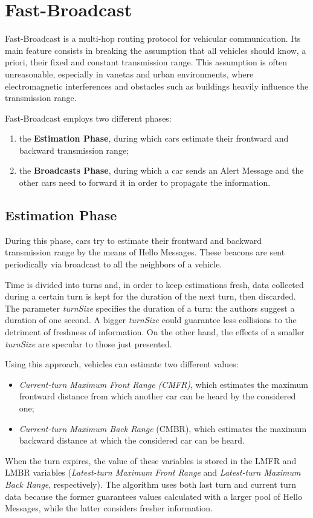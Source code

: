
\chapter{Fast-Broadcast}
	\label{chapter:fb}
	Fast-Broadcast \cite{4199282} is a multi-hop routing protocol for vehicular communication. Its main feature consists in breaking the assumption that all vehicles should know, a priori, their fixed and constant transmission range. This assumption is often unreasonable, especially in \acrshort{vaneta}s and urban environments, where electromagnetic interferences and obstacles such as buildings heavily influence the transmission range.
	
	
	Fast-Broadcast employs two different phases:
	\begin{enumerate}
		\item the \textbf{Estimation Phase}, during which cars estimate their frontward and backward transmission range;
		\item the \textbf{Broadcasts Phase}, during which a car sends an Alert Message and the other cars need to forward it in order to propagate the information.
	\end{enumerate}

	\section{Estimation Phase}
		During this phase, cars try to estimate their frontward and backward transmission range by the means of Hello Messages. These beacons are sent periodically via broadcast to all the neighbors of a vehicle.
		
		
		Time is divided into turns and, in order to keep estimations fresh, data collected during a certain turn is kept for the duration of the next turn, then discarded. The parameter \textit{turnSize} specifies the duration of a turn: the authors suggest a duration of one second. A bigger \textit{turnSize} could guarantee less collisions to the detriment of freshness of information. On the other hand, the effects of a smaller \textit{turnSize} are specular to those just presented. 
		
		
		Using this approach, vehicles can estimate two different values:
		\begin{itemize}
			\item \textit{Current-turn Maximum Front Range (CMFR)}, which estimates the maximum frontward distance from which another car can be heard by the considered one;
			\item \textit{Current-turn Maximum Back Range} (CMBR), which estimates the maximum backward distance at which the considered car can be heard.
		\end{itemize}
		When the turn expires, the value of these variables is stored in the LMFR and LMBR variables (\textit{Latest-turn Maximum Front Range} and \textit{Latest-turn Maximum Back Range}, respectively). The algorithm uses both last turn and current turn data because the former guarantees values calculated with a larger pool of Hello Messages, while the latter considers fresher information.
		
